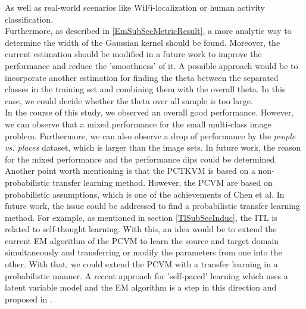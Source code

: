 As well as real-world scenarios like WiFi-localization or human activity classification.\cite[p. 32]{Weiss.2016}\\
Furthermore, as described in \ref{EmSubSecMetricResult}, a more analytic way to determine the width of the Gaussian kernel should be found. Moreover, the current estimation should be modified in a future work to improve the performance and reduce the 'smoothness' of it.
A possible approach would be to incorporate another estimation for finding the theta between the separated classes in the training set and combining them with the overall theta. In this case, we could decide whether the theta over all sample is too large.\\
In the course of this study, we observed an overall good performance. However, we can observe that a mixed performance for the small multi-class image problem. Furthermore, we can also observe a drop of performance by the \textit{people vs. places} dataset, which is larger than the image sets.
In future work, the reason for the mixed performance and the performance dips could be determined.\\
Another point worth mentioning is that the \acs{PCTKVM} is based on a non-probabilistic transfer learning method. 
However, the \acs{PCVM} are based on probabilistic assumptions, which is one of the achievements of Chen et al.
In future work, the issue could be addressed to find a probabilistic transfer learning method.
For example, as mentioned in section \ref{TlSubSecInduc}, the \acl{ITL} is related to self-thought learning.
With this, an idea would be to extend the current \acs{EM} algorithm of the \acs{PCVM} to learn the source and target domain simultaneously and transferring or modify the parameters from one into the other.
With that, we could extend the \acs{PCVM} with a transfer learning in a probabilistic manner.
A recent approach for 'self-paced' learning which uses a latent variable model and the \acs{EM} algorithm is a step in this direction and proposed in \cite{Kumar.2010}.

